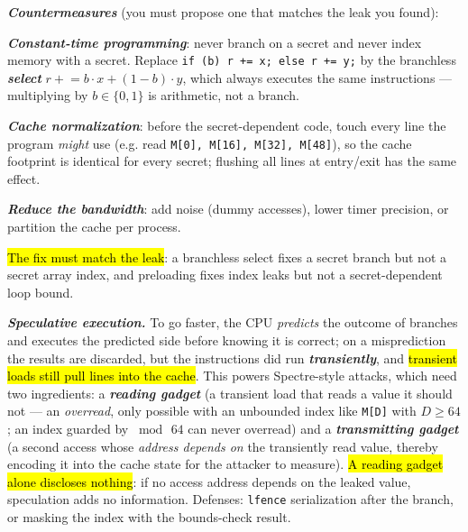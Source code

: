 \documentclass[12pt, a4paper]{article}
\newcommand{\term}[1]{\textbf{\textit{#1}}}        %
\newcommand{\imp}[1]{\hl{#1}}                       %
\begin{document}
\term{Countermeasures} (you must propose one that matches the leak you found): \begin{tightitem} \item \term{Constant-time programming}: never branch on a secret and never index memory with a secret. Replace \texttt{if (b) r += x; else r += y;} by the branchless \term{select} $r \mathrel{+}= b \cdot x + (1-b) \cdot y$, which always executes the same instructions --- multiplying by $b \in \{0,1\}$ is arithmetic, not a branch. \item \term{Cache normalization}: before the secret-dependent code, touch every line the program \emph{might} use (e.g. read \texttt{M[0], M[16], M[32], M[48]}), so the cache footprint is identical for every secret; flushing all lines at entry/exit has the same effect. \item \term{Reduce the bandwidth}: add noise (dummy accesses), lower timer precision, or partition the cache per process. \end{tightitem} \imp{The fix must match the leak}: a branchless select fixes a secret branch but not a secret array index, and preloading fixes index leaks but not a secret-dependent loop bound.

\term{Speculative execution.} To go faster, the CPU \emph{predicts} the outcome of branches and executes the predicted side before knowing it is correct; on a misprediction the results are discarded, but the instructions did run \term{transiently}, and \imp{transient loads still pull lines into the cache}. This powers Spectre-style attacks, which need two ingredients: a \term{reading gadget} (a transient load that reads a value it should not --- an \emph{overread}, only possible with an unbounded index like \texttt{M[D]} with $D \geq 64$; an index guarded by $\bmod\, 64$ can never overread) and a \term{transmitting gadget} (a second access whose \emph{address depends on} the transiently read value, thereby encoding it into the cache state for the attacker to measure). \imp{A reading gadget alone discloses nothing}: if no access address depends on the leaked value, speculation adds no information. Defenses: \texttt{lfence} serialization after the branch, or masking the index with the bounds-check result.
\end{document}
